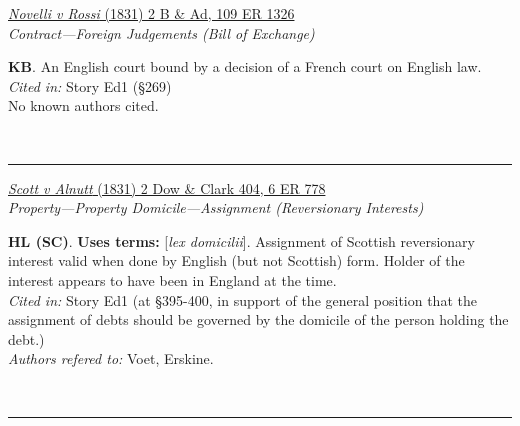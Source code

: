 \documentclass[twoside]{article}
\begin{document}
        \begin{small}
        \begin{center}
        \href{https://heinonline.org/HOL/P?h=hein.engrep/engrf0109&i=1330}{\textit{Novelli v Rossi} (1831) 2 B \& Ad, 109 ER 1326} \label{61} \\ 
\textit{Contract---Foreign Judgements (Bill of Exchange)}\\
        \end{center}
        \textbf{KB}. An English court bound by a decision of a French court on English law.\\\textit{Cited in: }Story Ed1 (§269)\\No known authors cited.
        \end{small}\\
        \rule{\textwidth}{0.5pt}
        

        \begin{small}
        \begin{center}
        \href{https://heinonline.org/HOL/P?h=hein.engrep/engra0006&i=790}{\textit{Scott v Alnutt} (1831) 2 Dow \& Clark 404, 6 ER 778} \label{125} \\ 
\textit{Property---Property Domicile---Assignment (Reversionary Interests)}\\
        \end{center}
        \textbf{HL (SC)}.  \textbf{Uses terms: }[\textit{lex domicilii}]. Assignment of Scottish reversionary interest valid when done by English (but not Scottish) form. Holder of the interest appears to have been in England at the time.\\\textit{Cited in: }Story Ed1 (at §395-400, in support of the general position that the assignment of debts should be governed by the domicile of the person holding the debt.)\\\textit{Authors refered to: }Voet, Erskine.
        \end{small}\\
        \rule{\textwidth}{0.5pt}
        
\end{document}
